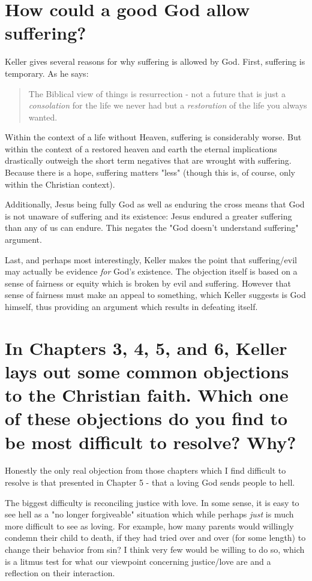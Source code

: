 \documentclass[12pt]{turabian-researchpaper}
\begin{document}
\section{How could a good God allow suffering?}

Keller gives several reasons for why suffering is allowed by God. First, suffering is temporary. As he says\autocite[pg.32]{keller2008reason}:

\begin{quote}
The Biblical view of things is resurrection - not a future that is just a \textit{consolation} for the life we never had but a \textit{restoration} of the life you always wanted.
\end{quote}

\noindent Within the context of a life without Heaven, suffering is considerably worse. But within the context of a restored heaven and earth the eternal implications drastically outweigh the short term negatives that are wrought with suffering. Because there is a hope, suffering matters "less" (though this is, of course, only within the Christian context).

Additionally, Jesus being fully God as well as enduring the cross means that God is not unaware of suffering and its existence: Jesus endured a greater suffering than any of us can endure. This negates the "God doesn't understand suffering" argument.

Last, and perhaps most interestingly, Keller makes the point that suffering/evil may actually be evidence \textit{for} God's existence.\autocite[pg.25]{keller2008reason} The objection itself is based on a sense of fairness or equity which is broken by evil and suffering. However that sense of fairness must make an appeal to something, which Keller suggests is God himself, thus providing an argument which results in defeating itself.

\section{In Chapters 3, 4, 5, and 6, Keller lays out some common objections to the Christian faith. Which one of these objections do you find to be most difficult to resolve? Why?}

Honestly the only real objection from those chapters which I find difficult to resolve is that presented in Chapter 5 - that a loving God sends people to hell.

The biggest difficulty is reconciling justice with love. In some sense, it is easy to see hell as a "no longer forgiveable" situation which while perhaps \textit{just} is much more difficult to see as loving. For example, how many parents would willingly condemn their child to death, if they had tried over and over (for some length) to change their behavior from sin? I think very few would be willing to do so, which is a litmus test for what our viewpoint concerning justice/love are and a reflection on their interaction.
\end{document}
